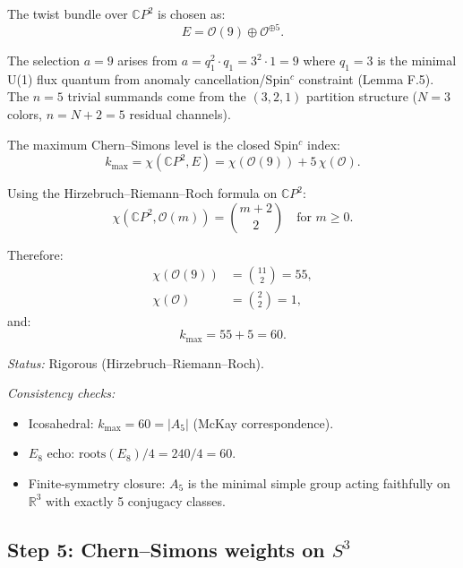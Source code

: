 \documentclass[12pt,a4paper]{article}
\begin{document}
The twist bundle over $\mathbb{C}P^2$ is chosen as:
\begin{equation}\tag{E4a}
E = \mathcal{O}(9) \oplus \mathcal{O}^{\oplus 5}.
\end{equation}

The selection $a = 9$ arises from $a = q_1^2 \cdot q_1 = 3^2 \cdot 1 = 9$
where $q_1 = 3$ is the minimal U(1) flux quantum from anomaly
cancellation/Spin$^c$ constraint (Lemma F.5).  The $n = 5$ trivial
summands come from the $(3,2,1)$ partition structure ($N = 3$ colors,
$n = N + 2 = 5$ residual channels).

The maximum Chern--Simons level is the closed Spin$^c$ index:
\begin{equation}\tag{E4b}
k_{\max} = \chi(\mathbb{C}P^2, E) = \chi(\mathcal{O}(9)) + 5\,\chi(\mathcal{O}).
\end{equation}

Using the Hirzebruch--Riemann--Roch formula on $\mathbb{C}P^2$:
\begin{equation}\tag{E4c}
\chi(\mathbb{C}P^2, \mathcal{O}(m)) = \binom{m+2}{2} \quad \text{for } m \geq 0.
\end{equation}

Therefore:
\begin{align}
\chi(\mathcal{O}(9)) &= \binom{11}{2} = 55, \tag{E4d}\\
\chi(\mathcal{O})     &= \binom{2}{2} = 1, \tag{E4e}
\end{align}
and:
\begin{equation}\tag{E4f}
\boxed{k_{\max} = 55 + 5 = 60.}
\end{equation}

\textit{Status:} Rigorous (Hirzebruch--Riemann--Roch).

\textit{Consistency checks:}
\begin{itemize}[nosep]
\item Icosahedral: $k_{\max} = 60 = |A_5|$ (McKay correspondence).
\item $E_8$ echo: $\mathrm{roots}(E_8)/4 = 240/4 = 60$.
\item Finite-symmetry closure: $A_5$ is the minimal simple group acting
  faithfully on $\mathbb{R}^3$ with exactly 5 conjugacy classes.
\end{itemize}

\subsection{Step 5: Chern--Simons weights on $S^3$}
\end{document}
